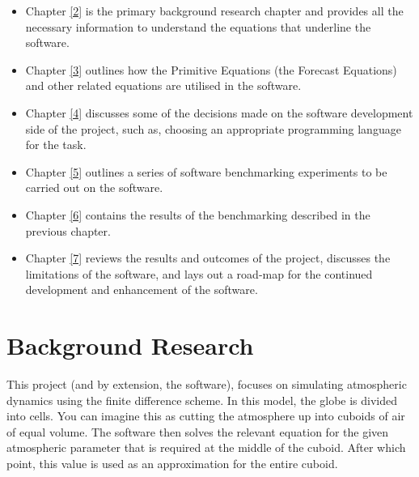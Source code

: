 \begin{itemize}
    \item Chapter \ref{2} is the primary background research chapter and provides all the necessary information to understand the equations that underline the software.
    \item Chapter \ref{3} outlines how the Primitive Equations (the Forecast Equations) and other related equations are utilised in the software.
    \item Chapter \ref{4} discusses some of the decisions made on the software development side of the project, such as, choosing an appropriate programming language for the task. 
    \item Chapter \ref{5} outlines a series of software benchmarking experiments to be carried out on the software.
    \item Chapter \ref{6} contains the results of the benchmarking described in the previous chapter.
    \item Chapter \ref{7} reviews the results and outcomes of the project, discusses the limitations of the software, and lays out a road-map for the continued development and enhancement of the software. 
\end{itemize}

\section{Background Research}
This project (and by extension, the software), focuses on simulating atmospheric dynamics using the finite difference scheme. In this model, the globe is divided into cells. You can imagine this as cutting the atmosphere up into cuboids of air of equal volume. The software then solves the relevant equation for the given atmospheric parameter that is required at the middle of the cuboid. After which point, this value is used as an approximation for the entire cuboid. 

\hfill

\begin{center}
\end{center}

